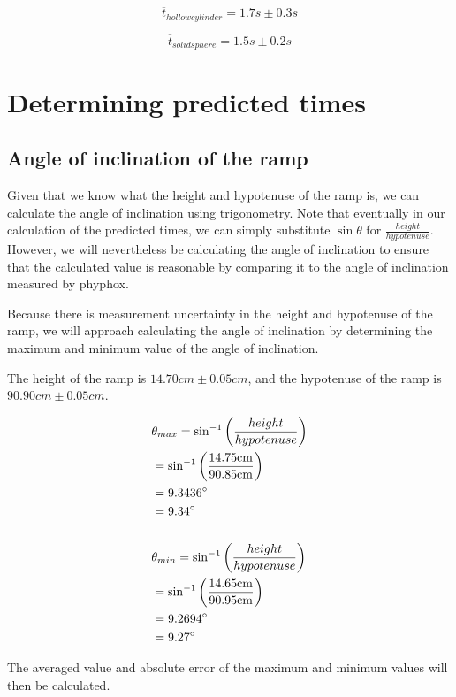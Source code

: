 \documentclass[letterpaper, 12pt]{article}
\begin{document}
$$
    \overline{t}_{hollow cylinder} = 1.7 \unit{s} \pm 0.3 \unit{s}
$$

$$
    \overline{t}_{solid sphere} = 1.5 \unit{s} \pm 0.2 \unit{s}
$$


\section{Determining predicted times}

\subsection{Angle of inclination of the ramp}

Given that we know what the height and hypotenuse of the ramp is, we can calculate
the angle of inclination using trigonometry. Note that eventually in our calculation of the predicted times,
we can simply substitute $\sin\theta$ for $\frac{height}{hypotenuse}$.
However, we will nevertheless be calculating the angle of inclination to ensure
that the calculated value is reasonable by comparing it to the angle of inclination
measured by phyphox.

Because there is measurement uncertainty in the height and hypotenuse of the ramp,
we will approach calculating the angle of inclination by determining the maximum
and minimum value of the angle of inclination.

The height of the ramp is $14.70\unit{cm} \pm 0.05\unit{cm}$, and the
hypotenuse of the ramp is $90.90\unit{cm} \pm 0.05\unit{cm}$.

\begin{align*}
     & \theta_{max} = \sin^{-1}\left(\frac{height}{hypotenuse}\right)
    \\
     & = \sin^{-1}\left(\frac{14.75\unit{cm}}{90.85\unit{cm}}\right)
    \\
     & = 9.3436\degree
    \\
     & = 9.34\degree
    \\
    \\
     & \theta_{min} = \sin^{-1}\left(\frac{height}{hypotenuse}\right)
    \\
     & = \sin^{-1}\left(\frac{14.65\unit{cm}}{90.95\unit{cm}}\right)
    \\
     & = 9.2694\degree
    \\
     & = 9.27\degree
\end{align*}

The averaged value and absolute error of the maximum and minimum values
will then be calculated.
\end{document}
